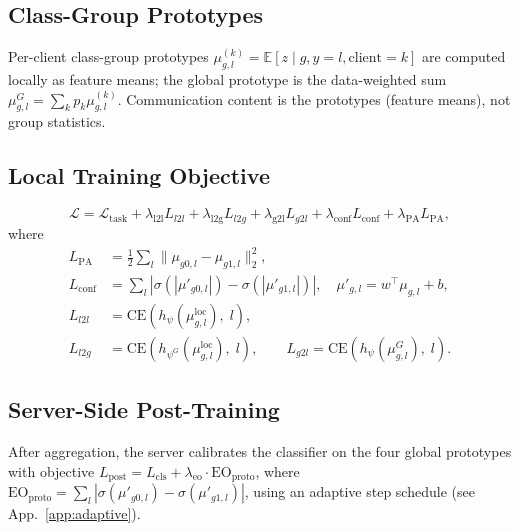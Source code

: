 \documentclass{article}
\newcommand{\E}{\mathbb{E}}
\newcommand{\proto}{\mu}
\begin{document}
\subsection{Class-Group Prototypes}
Per-client class-group prototypes $\proto_{g,l}^{(k)} = \E[z \mid g,y{=}l,\text{client}{=}k]$
are computed locally as feature means; the global prototype is the
data-weighted sum $\proto_{g,l}^G = \sum_k p_k \proto_{g,l}^{(k)}$.
Communication content is the prototypes (feature means), not group statistics.

\subsection{Local Training Objective}
\begin{equation}\label{eq:local_loss}
\mathcal L = \mathcal L_{\mathrm{task}}
  + \lambda_{\mathrm{l2l}} L_{l2l}
  + \lambda_{\mathrm{l2g}} L_{l2g}
  + \lambda_{\mathrm{g2l}} L_{g2l}
  + \lambda_{\mathrm{conf}} L_{\mathrm{conf}}
  + \lambda_{\mathrm{PA}} L_{\mathrm{PA}},
\end{equation}
where
\begin{align}
L_{\mathrm{PA}} &= \tfrac12 \sum_{l} \|\proto_{g0,l} - \proto_{g1,l}\|_2^2, \label{eq:LPA}\\
L_{\mathrm{conf}} &= \sum_{l} \left|\sigma(|\mu'_{g0,l}|) - \sigma(|\mu'_{g1,l}|)\right|, \quad \mu'_{g,l} = w^\top \proto_{g,l} + b,\label{eq:Lconf}\\
L_{l2l} &= \mathrm{CE}(h_\psi(\proto_{g,l}^{\mathrm{loc}}),\; l), \label{eq:Ll2l}\\
L_{l2g} &= \mathrm{CE}(h_{\psi^G}(\proto_{g,l}^{\mathrm{loc}}),\; l), \qquad
L_{g2l} = \mathrm{CE}(h_\psi(\proto_{g,l}^{G}),\; l). \label{eq:L2g2l}
\end{align}

\subsection{Server-Side Post-Training}
After aggregation, the server calibrates the classifier on the four global
prototypes with objective $L_{\mathrm{post}} = L_{\mathrm{cls}} + \lambda_{\mathrm{eo}} \cdot \mathrm{EO}_{\mathrm{proto}}$,
where $\mathrm{EO}_{\mathrm{proto}} = \sum_l |\sigma(\mu'_{g0,l}) - \sigma(\mu'_{g1,l})|$,
using an adaptive step schedule (see App.~\ref{app:adaptive}).
\end{document}
